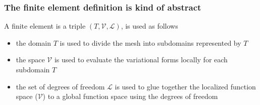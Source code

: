 \begin{frame}
  \frametitle{The finite element definition is kind of abstract}

  A finite element is a triple $(T, \mathcal{V}, \mathcal{L})$, is
  used as follows  
  \begin{itemize}
  \item
    the domain $T$ is used to divide the mesh into subdomains represented by $T$ 
  \item
   the space $\mathcal{V}$ is used to evaluate the variational forms  locally for each subdomain $T$ 
  \item
   the set of degrees of freedom $\mathcal{L}$ is used to glue together 
    the localized function space ($\mathcal{V}$) to a global
    function space using the degrees of freedom 
  \end{itemize}

\end{frame}
